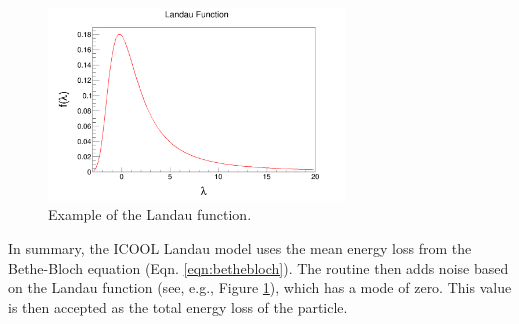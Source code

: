 \begin{figure}[h!]
  \centering
    \includegraphics[width=0.7\textwidth]{"Figures/landau example"} 
  \caption[Example of the Landau function.]{Example of the Landau function.}
  \label{fig:landau_example}
\end{figure}

In summary, the ICOOL Landau model uses the mean energy loss from the Bethe-Bloch equation (Eqn. \ref{eqn:bethebloch}). The routine then adds noise based on the Landau function (see, e.g., Figure \ref{fig:landau_example}), which has a mode of zero. This value is then accepted as the total energy loss of the particle.

